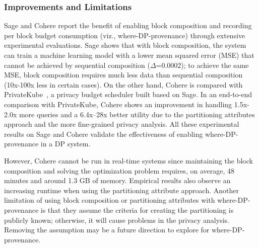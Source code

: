\subsubsection{Improvements and Limitations}
Sage and Cohere report the benefit of enabling block composition and recording per block budget consumption (viz., where-DP-provenance) through extensive experimental evaluations.
Sage shows that with block composition, the system can train a machine learning model with a lower mean squared error (MSE) that cannot be achieved by sequential composition ($\Delta$=0.0002); to achieve the same MSE, block composition requires much less data than sequential composition (10x-100x less in certain cases).
On the other hand, Cohere is compared with PrivateKube~\cite{LuoPTCGL21PrivateKube}, a privacy budget scheduler built based on Sage.
In an end-to-end comparison with PrivateKube, Cohere shows an improvement in handling 1.5x-2.0x more queries and a 6.4x–28x better utility due to the partitioning attributes approach and the more fine-grained privacy analysis. All these experimental results on Sage and Cohere validate the effectiveness of enabling where-DP-provenance in a DP system.

However, Cohere cannot be run in real-time systems since maintaining the block composition and solving the optimization problem requires, on average, 48 minutes and around 1.3 GB of memory. Empirical results also observe an increasing runtime when using the partitioning attribute approach.
Another limitation of using block composition or partitioning attributes with where-DP-provenance is that they assume the criteria for creating the partitioning is publicly known; otherwise, it will cause problems in the privacy analysis.
Removing the assumption may be a future direction to explore for where-DP-provenance.